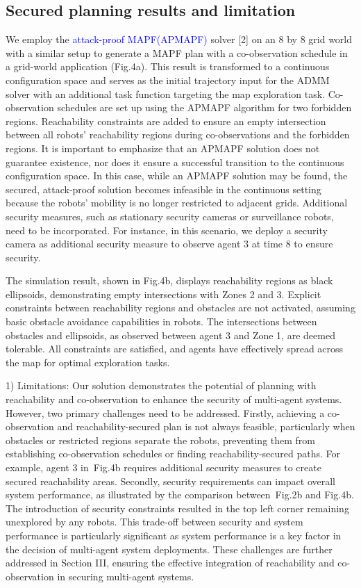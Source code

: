 \documentclass{article}
\newcommand{\new}[1]{\textcolor{blue}{#1}}
\newcommand{\news}{\color{blue}}
\begin{document}
\subsection{Secured planning results and limitation}\label{sec:ADMM-simulation}
We employ the \new{attack-proof MAPF(APMAPF)} solver [2] on an 8 by 8 grid world with a similar setup to generate a MAPF plan with a co-observation schedule in a grid-world application (Fig.4a). This result is transformed to a continuous configuration space and serves as the initial trajectory input for the ADMM solver with an additional task function targeting the map exploration task. Co-observation schedules are set up using the APMAPF algorithm for two forbidden regions. Reachability constraints are added to ensure an empty intersection between all robots' reachability regions during co-observations and the forbidden regions. {\news It is important to emphasize that an APMAPF solution does not guarantee existence, nor does it ensure a successful transition to the continuous configuration space. In this case, while an APMAPF solution may be found, the secured, attack-proof solution becomes infeasible in the continuous setting because the robots' mobility is no longer restricted to adjacent grids. Additional security measures, such as stationary security cameras or surveillance robots, need to be incorporated. For instance, in this scenario, we deploy a security camera as additional security measure to observe agent 3 at time $8$ to ensure security.}

The simulation result, shown in Fig.4b, displays reachability regions as black ellipsoids, demonstrating empty intersections with Zones 2 and 3. Explicit constraints between reachability regions and obstacles are not activated, assuming basic obstacle avoidance capabilities in robots. The intersections between obstacles and ellipsoids, as observed between agent 3 and Zone 1, are deemed tolerable. All constraints are satisfied, and agents have effectively spread across the map for optimal exploration tasks.

1) Limitations:
Our solution demonstrates the potential of planning with reachability and co-observation to enhance the security of multi-agent systems. {\news However, two primary challenges need to be addressed. Firstly, achieving a co-observation and reachability-secured plan is not always feasible, particularly when obstacles or restricted regions separate the robots, preventing them from establishing co-observation schedules or finding reachability-secured paths. For example, agent 3 in~Fig.4b requires additional security measures to create secured reachability areas. Secondly, security requirements can impact overall system performance, as illustrated by the comparison between~Fig.2b and Fig.4b. The introduction of security constraints resulted in the top left corner remaining unexplored by any robots. This trade-off between security and system performance is particularly significant as system performance is a key factor in the decision of multi-agent system deployments. These challenges are further addressed in Section III, ensuring the effective integration of reachability and co-observation in securing multi-agent systems.}
\end{document}
